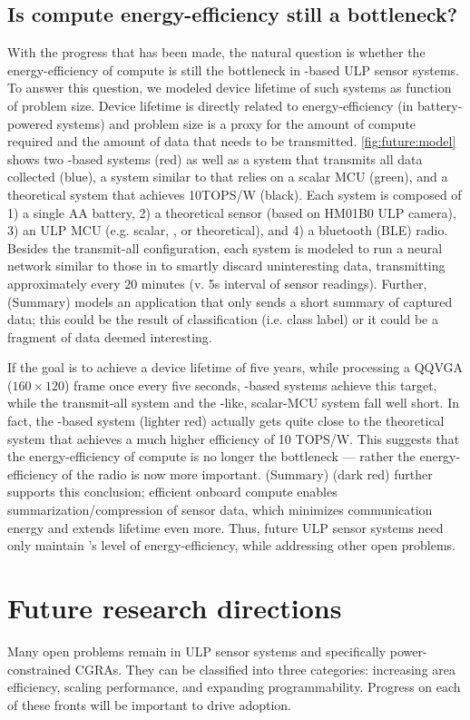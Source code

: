 \subsection{Is compute energy-efficiency still a bottleneck?}
With the progress that has been made, the natural question is whether the energy-efficiency of compute is still the bottleneck in \riptide-based ULP sensor systems.
% 
To answer this question, we modeled device lifetime of such systems as function of problem size.
%
Device lifetime is directly related to energy-efficiency (in battery-powered systems) and problem size is a proxy for the amount of compute required and the amount of data that needs to be transmitted.
% 
\autoref{fig:future:model} shows two \riptide-based systems (red) as well as a system that transmits all data collected (blue), a system similar to \sonic that relies on a scalar MCU (green), and a theoretical system that achieves 10TOPS/W (black).
% 
Each system is composed of 1) a single AA battery, 2) a theoretical sensor (based on HM01B0 ULP camera), 3) an ULP MCU (e.g. scalar, \riptide, or theoretical), and 4) a bluetooth (BLE) radio.
% 
Besides the transmit-all configuration, each system is modeled to run a neural network similar to those in \sonic to smartly discard uninteresting data, transmitting approximately every $20$ minutes (v. 5s interval of sensor readings).
% 
Further, \riptide (Summary) models an application that only sends a short summary of captured data; this could be the result of classification (i.e. class label) or it could be a fragment of data deemed interesting.

If the goal is to achieve a device lifetime of five years, while processing a QQVGA ($160\times120$) frame once every five seconds, \riptide-based systems achieve this target, while the transmit-all system and the \sonic-like, scalar-MCU system fall well short.
% 
In fact, the \riptide-based system (lighter red) actually gets quite close to the theoretical system that achieves a much higher efficiency of 10 TOPS/W.
% 
This suggests that the energy-efficiency of compute is no longer the bottleneck --- rather the energy-efficiency of the radio is now more important.
% 
\riptide (Summary) (dark red) further supports this conclusion; efficient onboard compute enables summarization/compression of sensor data, which minimizes communication energy and extends lifetime even more. 
% 
Thus, future ULP sensor systems need only maintain \riptide's level of energy-efficiency, while addressing other open problems.

\section{Future research directions}
Many open problems remain in ULP sensor systems and specifically power-constrained CGRAs.
% 
They can be classified into three categories: increasing area efficiency, scaling performance, and expanding programmability.
% 
Progress on each of these fronts will be important to drive adoption.

